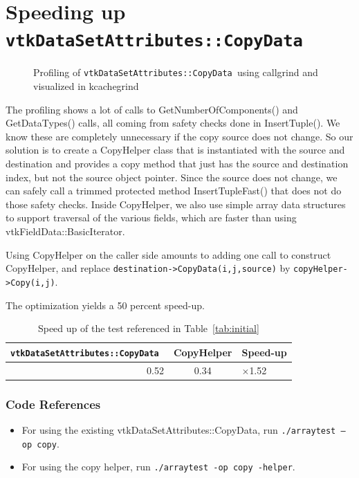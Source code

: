\documentclass{article}
\def \copydata {{\tt vtkDataSetAttributes::CopyData~}}
\begin{document}
\section{Speeding up \copydata}

\begin{figure}[H]
\caption{Profiling of \copydata using callgrind and visualized in kcachegrind}
\label{fig:insert}
\end{figure}

The profiling shows a lot of calls to GetNumberOfComponents() and
GetDataTypes() calls, all coming from safety checks done in
InsertTuple().  We know these are completely unnecessary if the copy
source does not change. So our solution is to create a CopyHelper
class that is instantiated with the source and destination and
provides a copy method that just has the source and destination index,
but not the source object pointer.  Since the source does not change,
we can safely call a trimmed protected method InsertTupleFast() that
does not do those safety checks. Inside CopyHelper, we also use
simple array data structures to support traversal of the various
fields, which are faster than using vtkFieldData::BasicIterator.

Using CopyHelper on the caller side amounts to adding one call to
construct CopyHelper, and replace {\tt destination->CopyData(i,j,source)}
by {\tt copyHelper->Copy(i,j)}.


The optimization yields a 50 percent speed-up.
\begin{table}[h]
\centering
\begin{tabular}{r|c|l}
\copydata & CopyHelper & Speed-up
\\\hline
 0.52          & 0.34         & $\times$1.52
\\
\end{tabular}
\caption{Speed up of the test referenced in Table~\ref{tab:initial}}
\end{table}


\subsubsection*{Code References}
\begin{itemize}
\item For using the existing vtkDataSetAttributes::CopyData, run {\tt ./arraytest --op copy}.
\item For using the copy helper, run {\tt ./arraytest -op copy -helper}.
\end{itemize}
\end{document}
